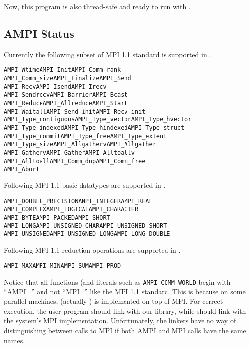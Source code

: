 \documentclass[10pt]{article}
\begin{document}
Now, this program is also thread-safe and ready to run with \ampi{}.  

\subsection{AMPI Status}

Currently the following subset of MPI 1.1 standard is supported in \ampi{}.

\begin{alltt}
  AMPI_Wtime           AMPI_Init          AMPI_Comm_rank       
  AMPI_Comm_size       AMPI_Finalize      AMPI_Send         
  AMPI_Recv            AMPI_Isend         AMPI_Irecv        
  AMPI_Sendrecv        AMPI_Barrier       AMPI_Bcast
  AMPI_Reduce          AMPI_Allreduce     AMPI_Start           
  AMPI_Waitall         AMPI_Send_init     AMPI_Recv_init    
  AMPI_Type_contiguous AMPI_Type_vector   AMPI_Type_hvector 
  AMPI_Type_indexed    AMPI_Type_hindexed AMPI_Type_struct
  AMPI_Type_commit     AMPI_Type_free     AMPI_Type_extent     
  AMPI_Type_size       AMPI_Allgatherv    AMPI_Allgather    
  AMPI_Gatherv         AMPI_Gather        AMPI_Alltoallv    
  AMPI_Alltoall        AMPI_Comm_dup      AMPI_Comm_free
  AMPI_Abort
\end{alltt}

Following MPI 1.1 basic datatypes are supported in \ampi{}.

\begin{alltt}
AMPI_DOUBLE_PRECISION AMPI_INTEGER       AMPI_REAL          
AMPI_COMPLEX          AMPI_LOGICAL       AMPI_CHARACTER     
AMPI_BYTE             AMPI_PACKED        AMPI_SHORT            
AMPI_LONG             AMPI_UNSIGNED_CHAR AMPI_UNSIGNED_SHORT
AMPI_UNSIGNED         AMPI_UNSIGNED_LONG AMPI_LONG_DOUBLE
\end{alltt}

Following MPI 1.1 reduction operations are supported in \ampi{}.

\begin{alltt}
AMPI_MAX  AMPI_MIN  AMPI_SUM  AMPI_PROD
\end{alltt}

Notice that all \ampi{} functions (and literals such as
\texttt{AMPI\_COMM\_WORLD} begin with ``AMPI\_'' and not ``MPI\_'' like the MPI
1.1 standard. This is because on some parallel machines, \charmpp{} (actually
\converse{}) is implemented on top of MPI. For correct execution, the user
program should link with our \ampi{} library, while \charmpp{} should link with
the system's MPI implementation. Unfortunately, the linkers have no way of
distinguishing between calls to MPI if both AMPI and MPI calls have the same
names.
\end{document}
